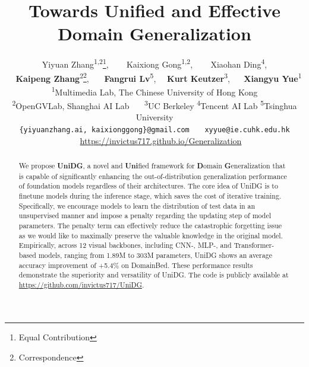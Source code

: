 \documentclass{article} \usepackage{iclr2024_conference,times}
\title{Towards Unified and Effective Domain Generalization}
\author{
Yiyuan Zhang\textsuperscript{1,2}\thanks{Equal Contribution},
~~~ Kaixiong Gong\textsuperscript{1,2},
~~~ Xiaohan Ding\textsuperscript{4},\\
~~\textbf{Kaipeng Zhang}\textsuperscript{2}\thanks{Correspondence},
~~~\textbf{Fangrui Lv}\textsuperscript{5},
\quad~~\textbf{Kurt Keutzer}\textsuperscript{3},
\quad~~ \textbf{Xiangyu Yue}\textsuperscript{1}\\
\textsuperscript{1}Multimedia Lab, The Chinese University of Hong Kong\\
\textsuperscript{2}OpenGVLab, Shanghai AI Lab~~~
\textsuperscript{3}UC Berkeley
\textsuperscript{4}Tencent AI Lab
\textsuperscript{5}Tsinghua University\\
{\tt\small \{yiyuanzhang.ai, kaixionggong\}@gmail.com}
~~~{\tt\small xyyue@ie.cuhk.edu.hk}\\
\quad \quad ~~~\url{https://invictus717.github.io/Generalization}
}
\begin{document}
	
	
	\maketitle
	
	\begin{abstract}
        We propose \textbf{UniDG}, a novel and \textbf{Uni}fied framework for \textbf{D}omain \textbf{G}eneralization that is capable of significantly enhancing the out-of-distribution generalization performance of foundation models regardless of their architectures. The core idea of UniDG is to finetune models during the inference stage, which saves the cost of iterative training. Specifically, we encourage models to learn the distribution of test data in an unsupervised manner and impose a penalty regarding the updating step of model parameters. The penalty term can effectively reduce the catastrophic forgetting issue as we would like to maximally preserve the valuable knowledge in the original model. Empirically, across 12 visual backbones, including CNN-, MLP-, and Transformer-based models, ranging from 1.89M to 303M parameters, UniDG shows an average accuracy improvement of +5.4\% on DomainBed. These performance results demonstrate the superiority and versatility of UniDG. The code is publicly available at \url{https://github.com/invictus717/UniDG}.
	\end{abstract}
	
\end{document}
